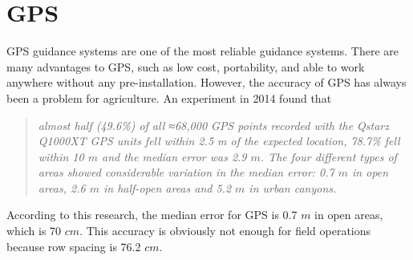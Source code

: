 \documentclass[letterpaper,12pt,oneside]{book}
\begin{document}
		\section{GPS}
		GPS guidance systems are one of the most reliable guidance systems. There are many advantages to GPS, such as low cost, portability, and able to work anywhere without any pre-installation. However, the accuracy of GPS has always been a problem for agriculture. An experiment in 2014 found that 
		\begin{quote}
			\textit{almost half (49.6\%) of all ≈68,000 GPS points recorded with the Qstarz Q1000XT GPS units fell within 2.5 m of the expected location, 78.7\% fell within 10 $m$ and the median error was 2.9 $m$. The four different types of areas showed considerable variation in the median error: 0.7 $m$ in open areas, 2.6 $m$ in half-open areas and 5.2 $m$ in urban canyons.} \cite{schipperijn2014dynamic}
		\end{quote}
		According to this research, the median error for GPS is 0.7 $m$ in open areas, which is 70 $cm$. This accuracy is obviously not enough for field operations because row spacing is 76.2 $cm$.
		
\end{document}
